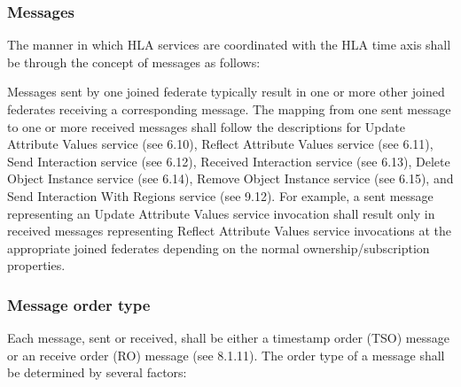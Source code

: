 \begin{compactstdpage}

    \subsubsection{Messages}

    The manner in which HLA services are coordinated with the HLA time axis shall be through the concept of messages as follows:


    Messages sent by one joined federate typically result in one or more other joined federates receiving a corresponding message. The mapping from one sent message to one or more received messages shall follow the descriptions for Update Attribute Values service (see 6.10), Reflect Attribute Values \rtiinitiated{} service (see 6.11), Send Interaction service (see 6.12), Received Interaction \rtiinitiated{} service (see 6.13), Delete Object Instance service (see 6.14), Remove Object Instance \rtiinitiated{} service (see 6.15), and Send Interaction With Regions service (see 9.12). For example, a sent message representing an Update Attribute Values service invocation shall result only in received messages representing Reflect Attribute Values \rtiinitiated{} service invocations at the appropriate joined federates depending on the normal ownership/subscription properties.

    \subsubsection{Message order type}

    Each message, sent or received, shall be either a timestamp order (TSO) message or an receive order (RO) message (see 8.1.11). The order type of a message shall be determined by several factors:


\end{compactstdpage}
